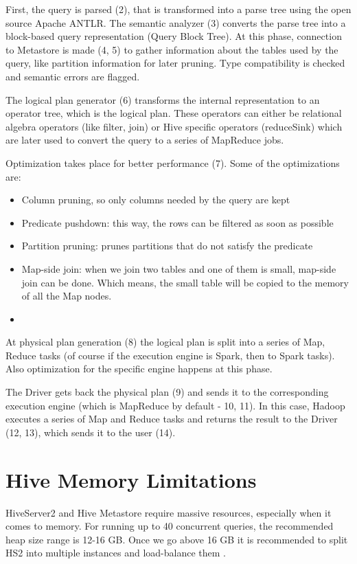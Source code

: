 First, the query is parsed (2), that is transformed into a parse tree using the open source Apache ANTLR.  The semantic analyzer (3) converts the parse tree into a block-based query representation (Query Block Tree). At this phase, connection to Metastore is made (4, 5) to gather information about the tables used by the query, like partition information for later pruning. Type compatibility is checked and semantic errors are flagged.

The logical plan generator (6) transforms the internal representation to an operator tree, which is the logical plan. These operators can either be relational algebra operators (like filter, join) or Hive specific operators (\eg reduceSink) which are later used to convert the query to a series of MapReduce jobs.

Optimization takes place for better performance (7). Some of the optimizations are: 
\begin{itemize}
	\item Column pruning, so only columns needed by the query are kept
	\item Predicate pushdown: this way, the rows can be filtered as soon as possible
	\item Partition pruning: prunes partitions that do not satisfy the predicate
	\item Map-side join: when we join two tables and one of them is small, map-side join can be done. Which means, the small table will be copied to the memory of all the Map nodes.
	\item \etc
\end{itemize}

At physical plan generation (8) the logical plan is split into a series of Map, Reduce tasks (of course if the execution engine is Spark, then to Spark tasks). Also optimization for the specific engine happens at this phase. 

The Driver gets back the physical plan (9) and sends it to the corresponding execution engine (which is MapReduce by default - 10, 11). In this case, Hadoop executes a series of Map and Reduce tasks and returns the result to the Driver (12, 13), which sends it to the user (14).

\section{Hive Memory Limitations}
HiveServer2 and Hive Metastore require massive resources, especially when it comes to memory. For running up to 40 concurrent queries, the recommended heap size range is 12-16 GB. Once we go above 16 GB it is recommended to split HS2 into multiple instances and load-balance them \cite{Hive-memory-problems}.

